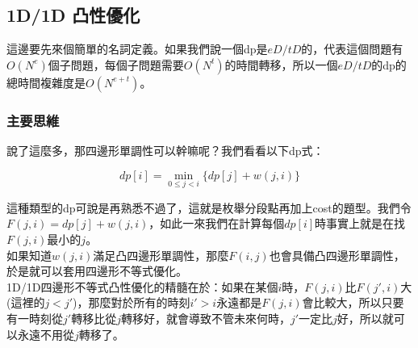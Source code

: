 	
	\subsection{1D/1D 凸性優化}
	
	這邊要先來個簡單的名詞定義。如果我們說一個dp是$eD/tD$的，代表這個問題有$O(N^e)$個子問題，每個子問題需要$O(N^t)$的時間轉移，所以一個$eD/tD$的dp的總時間複雜度是$O(N^{e+t})$。
	
	\subsubsection{主要思維}
	
	說了這麼多，那四邊形單調性可以幹嘛呢？我們看看以下dp式：
	
	\begin{displaymath}
	dp[i] = \min\limits_{0\leq j < i} \{dp[j] + w(j, i) \}
	\end{displaymath}
	
	這種類型的dp可說是再熟悉不過了，這就是枚舉分段點再加上cost的題型。我們令$F(j, i) = dp[j] + w(j, i)$，如此一來我們在計算每個$dp[i]$時事實上就是在找$F(j, i)$最小的$j$。\\
	
	如果知道$w(j, i)$滿足凸四邊形單調性，那麼$F(i, j)$也會具備凸四邊形單調性，於是就可以套用四邊形不等式優化。\\
	
	1D/1D四邊形不等式凸性優化的精髓在於：如果在某個$i$時，$F(j, i)$比$F(j', i)$大(這裡的$j < j'$)，那麼對於所有的時刻$i' > i$永遠都是$F(j, i)$會比較大，所以只要有一時刻從$j'$轉移比從$j$轉移好，就會導致不管未來何時，$j'$一定比$j$好，所以就可以永遠不用從$j$轉移了。\\
	
